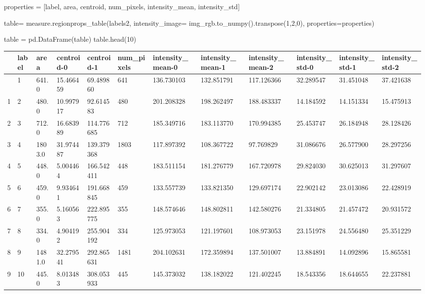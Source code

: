 \documentclass[
  french,
  11pt,
  letterpaper,
  open=any,
  twoside=false,
  french]{scrbook}
\newenvironment{Shaded}{\begin{snugshade}}{\end{snugshade}}
\newcommand{\DecValTok}[1]{\textcolor[rgb]{0.68,0.00,0.00}{#1}}
\newcommand{\NormalTok}[1]{\textcolor[rgb]{0.00,0.23,0.31}{#1}}
\newcommand{\OperatorTok}[1]{\textcolor[rgb]{0.37,0.37,0.37}{#1}}
\newcommand{\StringTok}[1]{\textcolor[rgb]{0.13,0.47,0.30}{#1}}
\newcounter{none} %
\begin{document}
\begin{Shaded}
\begin{Highlighting}[]
\NormalTok{properties }\OperatorTok{=}\NormalTok{ [}\StringTok{\textquotesingle{}label\textquotesingle{}}\NormalTok{, }\StringTok{\textquotesingle{}area\textquotesingle{}}\NormalTok{, }\StringTok{\textquotesingle{}centroid\textquotesingle{}}\NormalTok{, }\StringTok{\textquotesingle{}num\_pixels\textquotesingle{}}\NormalTok{, }\StringTok{\textquotesingle{}intensity\_mean\textquotesingle{}}\NormalTok{, }\StringTok{\textquotesingle{}intensity\_std\textquotesingle{}}\NormalTok{]}

\NormalTok{table}\OperatorTok{=}\NormalTok{   measure.regionprops\_table(labels2, intensity\_image}\OperatorTok{=}\NormalTok{ img\_rgb.to\_numpy().transpose(}\DecValTok{1}\NormalTok{,}\DecValTok{2}\NormalTok{,}\DecValTok{0}\NormalTok{), properties}\OperatorTok{=}\NormalTok{properties)}

\NormalTok{table }\OperatorTok{=}\NormalTok{ pd.DataFrame(table)}
\NormalTok{table.head(}\DecValTok{10}\NormalTok{)}
\end{Highlighting}
\end{Shaded}

{\def\LTcaptype{none} %
\begin{longtable}[]{@{}llllllllllll@{}}
\toprule\noalign{}
& label & area & centroid-0 & centroid-1 & num\_pixels &
intensity\_mean-0 & intensity\_mean-1 & intensity\_mean-2 &
intensity\_std-0 & intensity\_std-1 & intensity\_std-2 \\
\midrule\noalign{}
\endhead
\bottomrule\noalign{}
\endlastfoot
0 & 1 & 641.0 & 15.466459 & 69.489860 & 641 & 136.730103 & 132.851791 &
117.126366 & 32.289547 & 31.451048 & 37.421638 \\
1 & 2 & 480.0 & 10.997917 & 92.614583 & 480 & 201.208328 & 198.262497 &
188.483337 & 14.184592 & 14.151334 & 15.475913 \\
2 & 3 & 712.0 & 16.683989 & 114.776685 & 712 & 185.349716 & 183.113770 &
170.994385 & 25.453747 & 26.184948 & 28.128426 \\
3 & 4 & 1803.0 & 31.974487 & 139.379368 & 1803 & 117.897392 & 108.367722
& 97.769829 & 31.086676 & 26.577900 & 28.297256 \\
4 & 5 & 448.0 & 5.004464 & 166.542411 & 448 & 183.511154 & 181.276779 &
167.720978 & 29.824030 & 30.625013 & 31.297607 \\
5 & 6 & 459.0 & 9.934641 & 191.668845 & 459 & 133.557739 & 133.821350 &
129.697174 & 22.902142 & 23.013086 & 22.428919 \\
6 & 7 & 355.0 & 5.160563 & 222.895775 & 355 & 148.574646 & 148.802811 &
142.580276 & 21.334805 & 21.457472 & 20.931572 \\
7 & 8 & 334.0 & 4.904192 & 255.904192 & 334 & 125.973053 & 121.197601 &
108.973053 & 23.151978 & 24.556480 & 25.351229 \\
8 & 9 & 1481.0 & 32.279541 & 292.865631 & 1481 & 204.102631 & 172.359894
& 137.501007 & 13.884891 & 14.092896 & 15.865581 \\
9 & 10 & 445.0 & 8.013483 & 308.053933 & 445 & 145.373032 & 138.182022 &
121.402245 & 18.543356 & 18.644655 & 22.237881 \\
\end{longtable}
}
\end{document}
